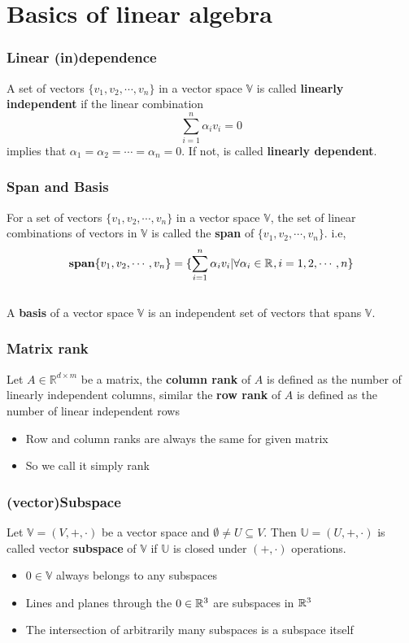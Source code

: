 \section{Basics of linear algebra} 
\begin{frame}\frametitle{Linear (in)dependence}
    A set of vectors $\{v_1, v_2,\cdots,v_n\}$ in a  vector space $\mathbb{V}$ is called \textbf{linearly independent} if
    the linear combination 
    \begin{equation*}
        \sum_{i=1}^n\alpha_iv_i=0
    \end{equation*}
    implies that $\alpha_1=\alpha_2=\cdots=\alpha_n=0$. If not, is called \textbf{linearly dependent}.  
\end{frame}

\begin{frame}\frametitle{Span and Basis}
    For a set of vectors $\{v_1, v_2,\cdots,v_n\}$ in a vector space $\mathbb{V}$, the set of linear combinations of 
    vectors in $\mathbb{V}$ is called the \textbf{span} of $\{v_1, v_2,\cdots,v_n\}$. i.e,
    \begin{equation*}
        \textbf{span}\{v_1, v_2,\cdots,v_n\} = \{\sum_{i=1}^n\alpha_iv_i|\forall\alpha_i\in{\mathbb R}^{}, i=1, 2, \cdots,n\}
    \end{equation*}\\
    \vspace{10mm}
    A \textbf{basis} of a vector space $\mathbb{V}$ is an independent set of vectors that spans $\mathbb{V}$.
\end{frame}

\begin{frame}\frametitle{Matrix rank}
    Let $A\in\mathbb{R}^{d\times m}$ be a matrix, the \textbf{column rank} of $A$ is defined as the number of linearly independent columns,
    similar the \textbf{row rank} of $A$ is defined as the number of linear independent rows
    \vspace*{5mm}
    \begin{itemize}
        \item Row and column ranks are always the same for given matrix
        \item So we call it simply rank
    \end{itemize}
\end{frame}

\begin{frame}\frametitle{(vector)Subspace}
    Let $\mathbb{V}=(V,+,\cdot)$ be a vector space and $\emptyset\neq U\subseteq V$. Then $\mathbb{U}=(U,+,\cdot)$ is called vector \textbf{subspace} of $\mathbb{V}$
    if $\mathbb{U}$ is closed under $(+,\cdot)$ operations.
    \vspace*{10mm}
    \begin{itemize}
        \item $0\in\mathbb{V}$ always belongs to any subspaces  
        \item Lines and planes through the $0\in{\mathbb R}^{3}$ are subspaces in ${\mathbb R}^{3}$
        \item The intersection of arbitrarily many subspaces is a subspace itself
    \end{itemize}
\end{frame}

